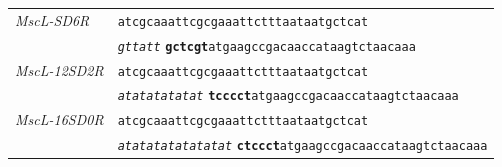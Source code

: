 \documentclass[12pt]{caltech_thesis}
\begin{document}
\begin{longtable}[]{@{}
  >{\raggedright\arraybackslash}p{}
  >{\raggedright\arraybackslash}p{}@{}}
\emph{MscL-SD6R} & \texttt{atcgcaaattcgcgaaattctttaataatgctcat} \\
& \emph{\texttt{gttatt}}
\textbf{\texttt{gctcgt}}\texttt{atgaagccgacaaccataagtctaacaaa} \\
\emph{MscL-12SD2R} & \texttt{atcgcaaattcgcgaaattctttaataatgctcat} \\
& \emph{\texttt{atatatatatat}}
\textbf{\texttt{tcccct}}\texttt{atgaagccgacaaccataagtctaacaaa} \\
\emph{MscL-16SD0R} & \texttt{atcgcaaattcgcgaaattctttaataatgctcat} \\
& \emph{\texttt{atatatatatatatat}}
\textbf{\texttt{ctccct}}\texttt{atgaagccgacaaccataagtctaacaaa} \\
\bottomrule()
\end{longtable}

\printbibliography
\end{document}
